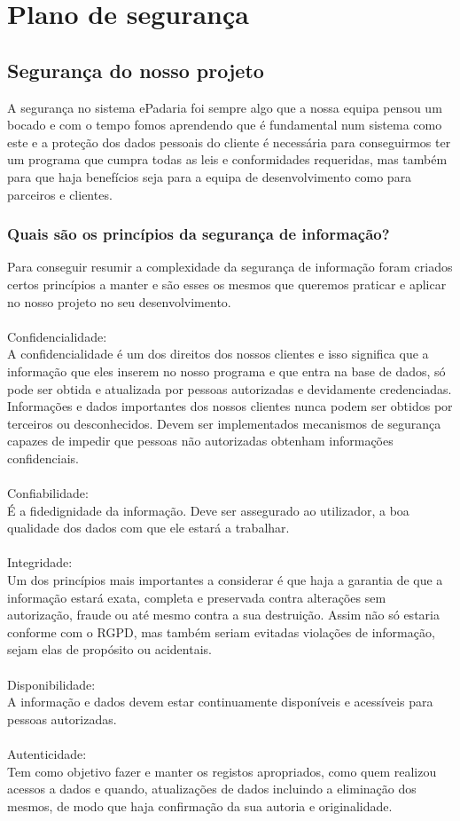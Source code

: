 \chapter{Plano de segurança}
\label{plano_de_segurança}
\section{Segurança do nosso projeto}
A segurança no sistema ePadaria foi sempre algo que a nossa equipa pensou um bocado e com o tempo fomos aprendendo que é fundamental num sistema como este e a proteção dos dados pessoais do cliente é necessária para conseguirmos ter um programa que cumpra todas as leis e conformidades requeridas, mas também para que haja benefícios seja para a equipa de desenvolvimento como para parceiros e clientes.\\

\subsection{Quais são os princípios da segurança de informação?}
Para conseguir resumir a complexidade da segurança de informação foram criados certos princípios a manter e são esses os mesmos que queremos praticar e aplicar no nosso projeto no seu desenvolvimento.\\
\\
Confidencialidade:\\
A confidencialidade é um dos direitos dos nossos clientes e isso significa que a informação que eles inserem no nosso programa e que entra na base de dados, só pode ser obtida e atualizada por pessoas autorizadas e devidamente credenciadas. Informações e dados importantes dos nossos clientes nunca podem ser obtidos por terceiros ou desconhecidos.
Devem ser implementados mecanismos de segurança capazes de impedir que pessoas não autorizadas obtenham informações confidenciais.\\
\\Confiabilidade:\\
É a fidedignidade da informação. Deve ser assegurado ao utilizador, a boa qualidade dos dados com que ele estará a trabalhar.\\
\\Integridade:\\
Um dos princípios mais importantes a considerar é que haja a garantia de que a informação estará exata, completa e preservada contra alterações sem autorização, fraude ou até mesmo contra a sua destruição.
Assim não só estaria conforme com o RGPD, mas também seriam evitadas violações de informação, sejam elas de propósito ou acidentais.\\
\\Disponibilidade:\\
A informação e dados devem estar continuamente disponíveis e acessíveis para pessoas autorizadas.\\
\\Autenticidade:\\
Tem como objetivo fazer e manter os registos apropriados, como quem realizou acessos a dados e quando, atualizações de dados incluindo a eliminação dos mesmos, de modo que haja confirmação da sua autoria e originalidade.


